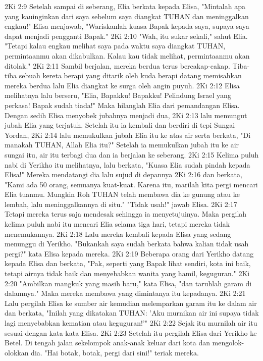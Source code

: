 2Ki 2:9  Setelah sampai di seberang, Elia berkata kepada Elisa, "Mintalah apa yang kauinginkan dari saya sebelum saya diangkat TUHAN dan meninggalkan engkau!" Elisa menjawab, "Wariskanlah kuasa Bapak kepada saya, supaya saya dapat menjadi pengganti Bapak."
2Ki 2:10  "Wah, itu sukar sekali," sahut Elia. "Tetapi kalau engkau melihat saya pada waktu saya diangkat TUHAN, permintaanmu akan dikabulkan. Kalau kau tidak melihat, permintaanmu akan ditolak."
2Ki 2:11  Sambil berjalan, mereka berdua terus bercakap-cakap. Tiba-tiba sebuah kereta berapi yang ditarik oleh kuda berapi datang memisahkan mereka berdua lalu Elia diangkat ke surga oleh angin puyuh.
2Ki 2:12  Elisa melihatnya lalu berseru, "Elia, Bapakku! Bapakku! Pelindung Israel yang perkasa! Bapak sudah tiada!" Maka hilanglah Elia dari pemandangan Elisa. Dengan sedih Elisa menyobek jubahnya menjadi dua,
2Ki 2:13  lalu memungut jubah Elia yang terjatuh. Setelah itu ia kembali dan berdiri di tepi Sungai Yordan,
2Ki 2:14  lalu memukulkan jubah Elia itu ke atas air serta berkata, "Di manakah TUHAN, Allah Elia itu?" Setelah ia memukulkan jubah itu ke air sungai itu, air itu terbagi dua dan ia berjalan ke seberang.
2Ki 2:15  Kelima puluh nabi di Yerikho itu melihatnya, lalu berkata, "Kuasa Elia sudah pindah kepada Elisa!" Mereka mendatangi dia lalu sujud di depannya
2Ki 2:16  dan berkata, "Kami ada 50 orang, semuanya kuat-kuat. Karena itu, marilah kita pergi mencari Elia tuanmu. Mungkin Roh TUHAN telah membawa dia ke gunung atau ke lembah, lalu meninggalkannya di situ." "Tidak usah!" jawab Elisa.
2Ki 2:17  Tetapi mereka terus saja mendesak sehingga ia menyetujuinya. Maka pergilah kelima puluh nabi itu mencari Elia selama tiga hari, tetapi mereka tidak menemukannya.
2Ki 2:18  Lalu mereka kembali kepada Elisa yang sedang menunggu di Yerikho. "Bukankah saya sudah berkata bahwa kalian tidak usah pergi?" kata Elisa kepada mereka.
2Ki 2:19  Beberapa orang dari Yerikho datang kepada Elisa dan berkata, "Pak, seperti yang Bapak lihat sendiri, kota ini baik, tetapi airnya tidak baik dan menyebabkan wanita yang hamil, keguguran."
2Ki 2:20  "Ambilkan mangkuk yang masih baru," kata Elisa, "dan taruhlah garam di dalamnya." Maka mereka membawa yang dimintanya itu kepadanya.
2Ki 2:21  Lalu pergilah Elisa ke sumber air kemudian melemparkan garam itu ke dalam air dan berkata, "Inilah yang dikatakan TUHAN: 'Aku murnikan air ini supaya tidak lagi menyebabkan kematian atau keguguran!'"
2Ki 2:22  Sejak itu murnilah air itu sesuai dengan kata-kata Elisa.
2Ki 2:23  Setelah itu pergilah Elisa dari Yerikho ke Betel. Di tengah jalan sekelompok anak-anak keluar dari kota dan mengolok-olokkan dia. "Hai botak, botak, pergi dari sini!" teriak mereka.
